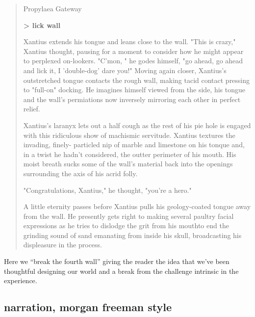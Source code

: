 \begin{quote}
  \small{
    Propylaea Gateway
    
    \textbf{> lick wall}
    
Xantius extends his tongue and leans close to the wall.  "This is crazy," Xantius
thought, pausing for a moment to consider how he might appear to perplexed on-lookers.
"C'mon, " he godes himself, "go ahead, go ahead and lick it, I 'double-dog' dare you!"
Moving again closer, Xantius's outstretched tongue contacts the rough wall, making
tacid contact pressing to "full-on" docking.  He imagines himself viewed from the side,
his tongue and the wall's permiations now inversely mirroring each other in perfect
relief.

Xantius's laranyx lets out a half cough as the rest of his pie hole is engaged with
this ridiculous show of machismic servitude.  Xantius textures the invading, finely-
particled nip of marble and limestone on his tonque and, in a twist he hadn't
considered, the outter perimeter of his mouth.  His moist breath sucks some of the
wall's material back into the openings surrounding the axis of his acrid folly.

"Congratulations, Xantius," he thought, "you're a hero."

A little eternity passes before Xantius pulls his geology-coated tongue away from the
wall.  He presently gets right to making several paultry facial expressions as he
tries to dislodge the grit from his mouth\textemdash to end the grinding sound of sand emanating
from inside his skull, broadcasting his displeasure in the process.
} %
\end{quote}

\noindent Here we ``break the fourth wall'' giving the reader the idea that we've been
thoughtful designing our world and a break from the challenge intrinsic in the
experience.

\subsection{narration, morgan freeman style}

